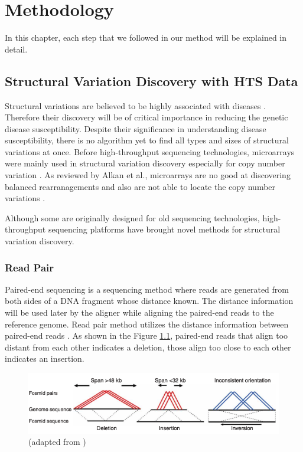 \chapter{Methodology}
In this chapter, each step that we followed in our method will be explained in detail.
\section{Structural Variation Discovery with HTS Data}
Structural variations are believed to be highly associated with diseases \cite{fanciulli2007fcgr3b,fellermann2006chromosome,aitman2006copy,gonzalez2005influence}. Therefore their discovery will be of critical importance in reducing the genetic disease susceptibility. Despite their significance in understanding disease susceptibility, there is no algorithm yet to find all types and sizes of structural variations at once. Before high-throughput sequencing technologies, microarrays were mainly used in structural variation discovery especially for copy number variation \cite{alkan2011genome}. As reviewed by Alkan et al., microarrays are no good at discovering balanced rearranagements and also are not able to locate the copy number variations \cite{alkan2011genome}. 

Although some are originally designed for old sequencing technologies, high-throughput sequencing platforms have brought novel methods for structural variation discovery. 
\subsection{Read Pair}
Paired-end sequencing is a sequencing method where reads are generated from both sides of a DNA fragment whose distance known. The distance information will be used later by the aligner while aligning the paired-end reads to the reference genome. Read pair method utilizes the distance information between paired-end reads \cite{tuzun2005fine}. As shown in the Figure \ref{readpair}, paired-end reads that align too distant from each other indicates a deletion, those align too close to each other indicates an insertion.

\begin{figure}[ht]
    \centering
    \includegraphics[scale=0.4]{images/readpair.png}
    \caption{(adapted from \cite{tuzun2005fine})}
    \label{readpair}
\end{figure}
